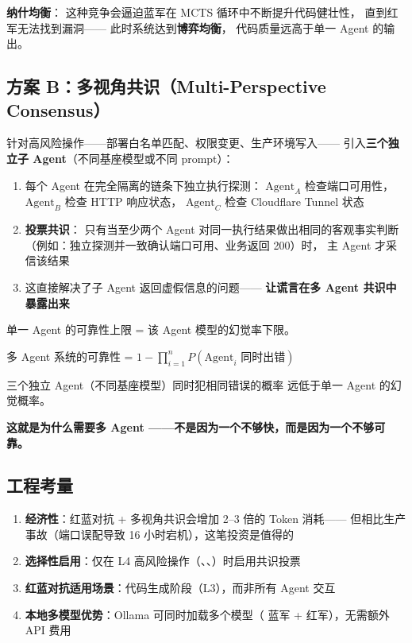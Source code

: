 \documentclass[10pt, openany]{book}
\begin{document}
\begin{framed}
\textbf{纳什均衡}：
这种竞争会逼迫蓝军在 MCTS 循环中不断提升代码健壮性，
直到红军无法找到漏洞——
此时系统达到\textbf{博弈均衡}，
代码质量远高于单一 Agent 的输出。
\end{framed}

\subsection{方案 B：多视角共识（Multi-Perspective Consensus）}

针对高风险操作——部署白名单匹配、权限变更、生产环境写入——
引入\textbf{三个独立子 Agent}（不同基座模型或不同 prompt）：

\begin{enumerate}
    \item 每个 Agent 在完全隔离的链条下独立执行探测：
        \(\text{Agent}_A\) 检查端口可用性，
        \(\text{Agent}_B\) 检查 HTTP 响应状态，
        \(\text{Agent}_C\) 检查 Cloudflare Tunnel 状态
    \item \textbf{投票共识}：
        只有当至少两个 Agent 对同一执行结果做出相同的客观事实判断
        （例如：独立探测并一致确认端口可用、业务返回 200）时，
        主 Agent 才采信该结果
    \item 这直接解决了子 Agent 返回虚假信息的问题——
        \textbf{让谎言在多 Agent 共识中暴露出来}
\end{enumerate}

\begin{principle}[多样性是安全的基石]
    单一 Agent 的可靠性上限 = 该 Agent 模型的幻觉率下限。
    
    多 Agent 系统的可靠性 = \(1 - \prod_{i=1}^{n} P(\text{Agent}_i \text{ 同时出错})\)
    
    三个独立 Agent（不同基座模型）同时犯相同错误的概率
    远低于单一 Agent 的幻觉概率。
    
    \textbf{这就是为什么需要多 Agent ——不是因为一个不够快，而是因为一个不够可靠。}
\end{principle}

\subsection{工程考量}

\begin{enumerate}
    \item \textbf{经济性}：红蓝对抗 + 多视角共识会增加 2--3 倍的 Token 消耗——
        但相比生产事故（端口误配导致 16 小时宕机），这笔投资是值得的
    \item \textbf{选择性启用}：仅在 L4 高风险操作（、、）时启用共识投票
    \item \textbf{红蓝对抗适用场景}：代码生成阶段（L3），而非所有 Agent 交互
    \item \textbf{本地多模型优势}：Ollama 可同时加载多个模型（ 蓝军 +  红军），无需额外 API 费用
\end{enumerate}
\end{document}
